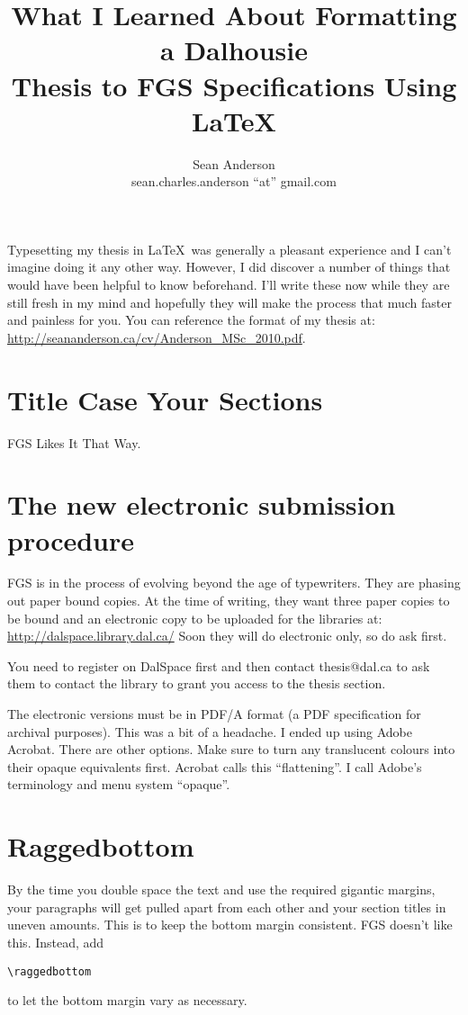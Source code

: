 \documentclass[12pt]{article}
\title{What I Learned About Formatting a Dalhousie\\ Thesis to FGS Specifications Using \LaTeX}
\author{Sean Anderson\\sean.charles.anderson ``at'' gmail.com}
\begin{document}
\maketitle
\tableofcontents
\setlength{\parskip}{1.9mm}

\bigskip
\bigskip

Typesetting my thesis in \LaTeX~was generally a pleasant experience and I can't imagine doing it any other way. However, I did discover a number of things that would have been helpful to know beforehand. I'll write these now while they are still fresh in my mind and hopefully they will make the process that much faster and painless for you. You can reference the format of my thesis at:\\
\url{http://seananderson.ca/cv/Anderson_MSc_2010.pdf}.

\section{Title Case Your Sections}
FGS Likes It That Way.

\section{The new electronic submission procedure}
FGS is in the process of evolving beyond the age of typewriters. They are phasing out paper bound copies. At the time of writing, they want three paper copies to be bound and an electronic copy to be uploaded for the libraries at: \url{http://dalspace.library.dal.ca/}
Soon they will do electronic only, so do ask first.

You need to register on DalSpace first and then contact thesis@dal.ca to ask them to contact the library to grant you access to the thesis section.

The electronic versions must be in PDF/A format (a PDF specification for archival purposes). This was a bit of a headache. I ended up using Adobe Acrobat. There are other options. Make sure to turn any translucent colours into their opaque equivalents first. Acrobat calls this ``flattening''. I call Adobe's terminology and menu system ``opaque''.

\section{Raggedbottom}
By the time you double space the text and use the required gigantic margins, your paragraphs will get pulled apart from each other and your section titles in uneven amounts. This is to keep the bottom margin consistent. FGS doesn't like this. Instead, add 
\begin{verbatim}
\raggedbottom
\end{verbatim}
to let the bottom margin vary as necessary.
\end{document}
